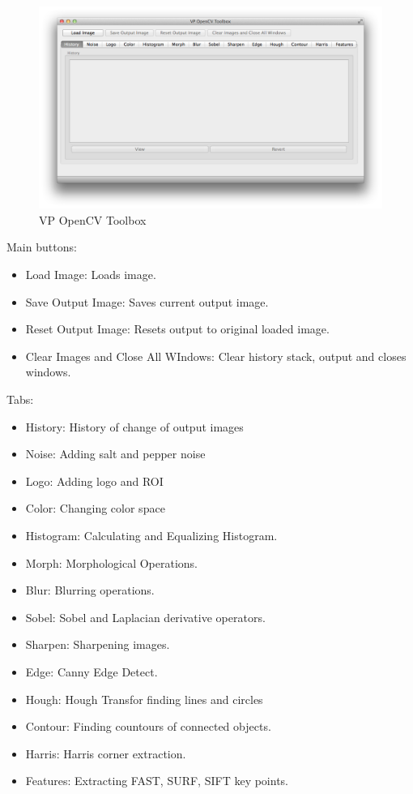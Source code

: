 \documentclass{article}
\begin{document}
\begin{figure}[H]
\begin{center}
\includegraphics[scale=0.4]{toolbox1.png}
\caption{VP OpenCV Toolbox}
\end{center}
\end{figure}	
	
	Main buttons:
	\begin{itemize}
		\item Load Image: Loads image.
		\item Save Output Image: Saves current output image.
		\item Reset Output Image: Resets output to original loaded image.
		\item Clear Images and Close All WIndows: Clear history stack, output and closes windows.
	\end{itemize}
	
	Tabs:
	\begin{itemize}
		\item History: History of change of output images
		\item Noise: Adding salt and pepper noise
		\item Logo: Adding logo and ROI
		\item Color: Changing color space
		\item Histogram: Calculating and Equalizing Histogram.
		\item Morph: Morphological Operations.
		\item Blur: Blurring operations.
		\item Sobel: Sobel and Laplacian derivative operators.
		\item Sharpen: Sharpening images.
		\item Edge: Canny Edge Detect.
		\item Hough: Hough Transfor finding lines and circles
		\item Contour: Finding countours of connected objects.
		\item Harris: Harris corner extraction.
		\item Features: Extracting FAST, SURF, SIFT key points.
	\end{itemize}
\end{document}
